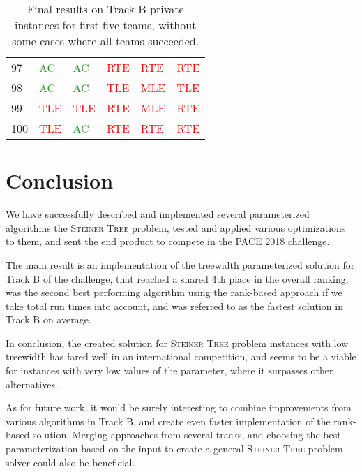 \documentclass[thesis=M,english,hidelinks]{FITthesis}[2012/10/20]
\theoremstyle{definition}
\begin{document}
\begin{table}[ht]
\begin{tabular}{ m{1cm} | m{1.5cm} m{1.5cm} m{1.5cm} m{1.5cm} m{1.5cm} }
        97 & \textcolor{ForestGreen}{AC} & \textcolor{ForestGreen}{AC} & \textcolor{Red}{RTE} & \textcolor{Red}{RTE} & \textcolor{Red}{RTE} \\
        98 & \textcolor{ForestGreen}{AC} & \textcolor{ForestGreen}{AC} & \textcolor{Red}{TLE} & \textcolor{Red}{MLE} & \textcolor{Red}{TLE} \\
        99 & \textcolor{Red}{TLE} & \textcolor{Red}{TLE} & \textcolor{Red}{RTE} & \textcolor{Red}{MLE} & \textcolor{Red}{RTE} \\
        100 & \textcolor{Red}{TLE} & \textcolor{ForestGreen}{AC} & \textcolor{Red}{RTE} & \textcolor{Red}{RTE} & \textcolor{Red}{RTE} \\
        \bottomrule
    \end{tabular}

    \caption{Final results on Track B private instances for first five teams, without some cases where all teams
    succeeded.}
    \label{tab:trackb}
\end{table}

\chapter{Conclusion}

We have successfully described and implemented several parameterized algorithms the \textsc{Steiner Tree} problem, tested and applied
various optimizations to them, and sent the end product to compete in the PACE 2018 challenge.

The main result is an implementation of the treewidth parameterized solution for Track B of the challenge, that reached
a shared 4th place in the overall ranking, was the second best performing algorithm using the rank-based approach if we
take total run times into account, and was referred to as the fastest solution in Track B on average.

In conclusion, the created solution for \textsc{Steiner Tree} problem instances with low treewidth has fared well in an
international competition, and seems to be a viable for instances with very low values of the parameter, where it
surpasses other alternatives.

As for future work, it would be surely interesting to combine improvements from various algorithms in Track B, and
create even faster implementation of the rank-based solution. Merging approaches from several tracks, and
choosing the best parameterization based on the input to create a general \textsc{Steiner Tree} problem solver could also
be beneficial.
\end{document}
